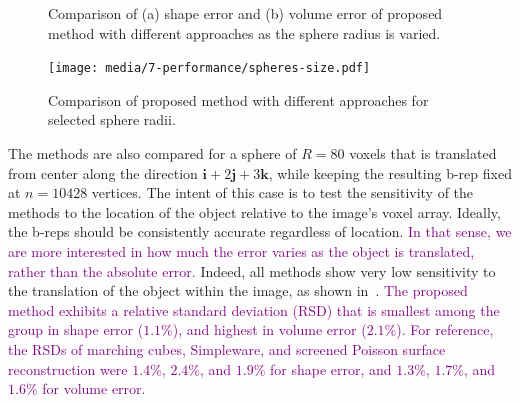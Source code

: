 \begin{figure}[b!]
	\centering
	\caption{Comparison of (a) shape error and (b) volume error of proposed method with different approaches as the sphere radius is varied.}
	\label{fig:graph2}
\end{figure}
\begin{figure}[ht!]
	\centering
	\texttt{[image: media/7-performance/spheres-size.pdf]}
	\caption{Comparison of proposed method with different approaches for selected sphere radii.}
	\label{fig:demos2}
\end{figure}
%
The methods are also compared for a sphere of $R = 80$ voxels that is translated from center along the direction $\bm{i}  + 2\bm{j} + 3\bm{k}$, while keeping the resulting b-rep fixed at $n = 10428$ vertices. The intent of this case is to test the sensitivity of the methods to the location of the object relative to the image's voxel array. Ideally, the b-reps should be consistently accurate regardless of location. \textcolor{purple}{In that sense, we are more interested in how much the error varies as the object is translated, rather than the absolute error.} Indeed, all methods show very low sensitivity to the translation of the object within the image, as shown in~. \textcolor{purple}{The proposed method exhibits a relative standard deviation (RSD) that is smallest among the group in shape error ($1.1\%$), and highest in volume error ($2.1\%$). For reference, the RSDs of marching cubes, Simpleware, and screened Poisson surface reconstruction were $1.4\%$, $2.4\%$, and $1.9\%$ for shape error, and $1.3\%$, $1.7\%$, and $1.6\%$ for volume error.} \\

